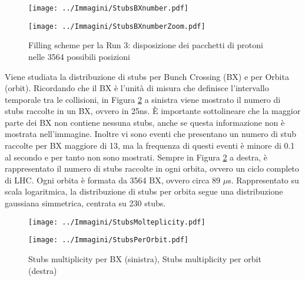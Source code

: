  \begin{figure}[t]
   \centering
   \begin{minipage}[b]{0.49\textwidth}
       \centering
       \texttt{[image: ../Immagini/StubsBXnumber.pdf]} 
     \end{minipage}
     \hfill 
     \begin{minipage}[b]{0.49\textwidth}
       \centering
       \texttt{[image: ../Immagini/StubsBXnumberZoom.pdf]} 
   \end{minipage}
   \caption{Filling scheme per la Run 3: disposizione dei pacchetti di protoni nelle 3564 possibili posizioni }
   \label{fig:Stubs1}
 \end{figure}


Viene studiata la distribuzione di stubs per Bunch Crossing (BX) e per Orbita (orbit). Ricordando che il BX è l'unità di misura che definisce l'intervallo temporale tra le collisioni, in Figura \ref{fig:StubsMolteplicity} a sinistra viene mostrato il numero di stubs raccolte in un BX, ovvero in 25ns. È importante sottolineare che la maggior parte dei BX non contiene nessuna stubs, anche se questa informazione non è mostrata nell'immagine. Inoltre vi sono eventi che presentano un numero di stub raccolte per BX maggiore di 13, ma la frequenza di questi eventi è minore di 0.1 al secondo e per tanto non sono mostrati.\newline
Sempre in Figura \ref{fig:StubsMolteplicity} a destra, è rappresentato il numero di stubs raccolte in ogni orbita, ovvero un ciclo completo di LHC. Ogni orbita è formata da 3564 BX, ovvero circa 89 $\mu$s. Rappresentato su scala logaritmica, la distribuzione di stubs per orbita segue una distribuzione gaussiana simmetrica, centrata su 230 stubs. 

 \begin{figure}[b]
  \centering
  \begin{minipage}[b]{0.49\textwidth}
      \centering
      \texttt{[image: ../Immagini/StubsMolteplicity.pdf]} 
    \end{minipage}
    \hfill 
    \begin{minipage}[b]{0.49\textwidth}
      \centering
      \texttt{[image: ../Immagini/StubsPerOrbit.pdf]} 
  \end{minipage}
  \caption{Stubs multiplicity per BX (sinistra), Stubs multiplicity per orbit (destra)}
  \label{fig:StubsMolteplicity}
\end{figure}



